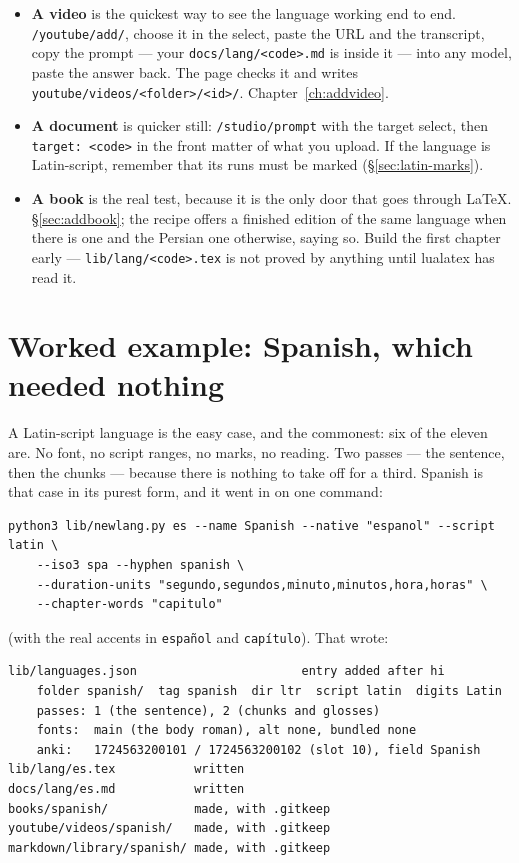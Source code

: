 \documentclass[11pt,oneside]{report}
\newcommand{\file}[1]{\texttt{#1}}
\begin{document}
\begin{itemize}
\item \textbf{A video} is the quickest way to see the language working end to
  end. \texttt{/youtube/add/}, choose it in the select, paste the URL and the
  transcript, copy the prompt --- your \file{docs/lang/<code>.md} is inside it
  --- into any model, paste the answer back. The page checks it and writes
  \file{youtube/videos/<folder>/<id>/}. Chapter~\ref{ch:addvideo}.
\item \textbf{A document} is quicker still: \texttt{/studio/prompt} with the
  target select, then \texttt{target: <code>} in the front matter of what you
  upload. If the language is Latin-script, remember that its runs must be
  marked (\S\ref{sec:latin-marks}).
\item \textbf{A book} is the real test, because it is the only door that goes
  through LaTeX. \S\ref{sec:addbook}; the recipe offers a finished edition of
  the same language when there is one and the Persian one otherwise, saying so.
  Build the first chapter early --- \file{lib/lang/<code>.tex} is not proved by
  anything until lualatex has read it.
\end{itemize}

\section{Worked example: Spanish, which needed nothing}

A Latin-script language is the easy case, and the commonest: six of the
eleven are. No font, no script ranges, no marks, no reading. Two passes ---
the sentence, then the chunks --- because there is nothing to take off for a
third. Spanish is that case in its purest form, and it went in on one
command:

\begin{lstlisting}
python3 lib/newlang.py es --name Spanish --native "espanol" --script latin \
    --iso3 spa --hyphen spanish \
    --duration-units "segundo,segundos,minuto,minutos,hora,horas" \
    --chapter-words "capitulo"
\end{lstlisting}

\noindent (with the real accents in \texttt{espa\~nol} and
\texttt{cap\'itulo}). That wrote:

\begin{lstlisting}
lib/languages.json                       entry added after hi
    folder spanish/  tag spanish  dir ltr  script latin  digits Latin
    passes: 1 (the sentence), 2 (chunks and glosses)
    fonts:  main (the body roman), alt none, bundled none
    anki:   1724563200101 / 1724563200102 (slot 10), field Spanish
lib/lang/es.tex           written
docs/lang/es.md           written
books/spanish/            made, with .gitkeep
youtube/videos/spanish/   made, with .gitkeep
markdown/library/spanish/ made, with .gitkeep
\end{lstlisting}
\end{document}
